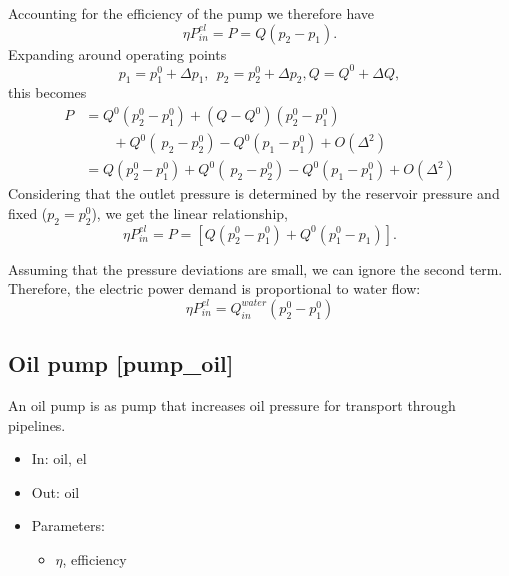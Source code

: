 \documentclass[12pt]{article}
\begin{document}
Accounting for the efficiency of the pump we therefore have
 \begin{equation} 
 	\eta P_{in}^{el}=P=Q \left( p_{2}-p_{1} \right) . 
 \end{equation}
%
Expanding around operating points  
\begin{equation}
 p_{1}=p_{1}^{0}+ \Delta p_{1},~~p_{2}=p_{2}^{0}+ \Delta p_{2}, Q=Q^{0}+ \Delta Q, 
 \end{equation} 
 this becomes
%
\begin{equation}
 \begin{split}
 P &=Q^{0} \left( p_{2}^{0}-p_{1}^{0} \right) 
 		+ \left( Q-Q^{0} \right)  \left( p_{2}^{0}-p_{1}^{0} \right) 
	\\& \qquad
 		+Q^{0} \left( ~p_{2}-p_{2}^{0} \right) 
 		-Q^{0} \left( p_{1}-p_{1}^{0} \right) 
 		+O \left(  \Delta ^{2} \right)  
	\\ &
	=Q \left( p_{2}^{0}-p_{1}^{0} \right) +Q^{0} \left( ~p_{2}-p_{2}^{0} \right) 
		-Q^{0} \left( p_{1}-p_{1}^{0} \right) 
		+O \left(  \Delta ^{2} \right)  
 \end{split}
 \end{equation}
%
Considering that the outlet pressure is determined by the reservoir pressure and fixed ($p_{2}=p_{2}^{0}$), we get the linear relationship,
 \begin{equation} 
 \eta P_{in}^{el}= P
 	= \left[ Q \left( p_{2}^{0}-p_{1}^{0} \right) +Q^{0} \left( p_{1}^{0}-p_{1} \right)  \right].  
 \end{equation}


Assuming that the pressure deviations are small, we can ignore the second term. Therefore, the electric power demand is proportional to water flow:
 \begin{equation}
 \eta P_{in}^{el}=Q_{in}^{water} \left( p_{2}^{0}-p_{1}^{0} \right)  
 \end{equation}



\subsection{Oil pump [pump\_oil]}
An oil pump is as pump that increases oil pressure for transport through pipelines.

\begin{itemize}
\item In: oil, el
\item Out: oil
\item Parameters:
\begin{itemize}[noitemsep,topsep=0pt]
	\item $\eta$,  efficiency
\end{itemize}
\end{itemize}
\end{document}
